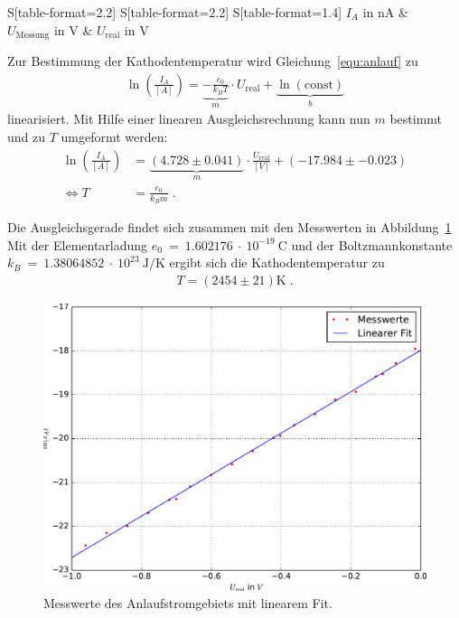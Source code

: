 \begin{table}
  \centering
  \caption{Stromstärke, Spannung und korrigierte Spannung im Anlaufstromgebiet.}
\label{tab:real}
  \begin{tabular}{
      S[table-format=2.2]
      S[table-format=2.2]
      S[table-format=1.4]
      }
      \toprule
       $\text{$I_A$ in $\si{\nano\ampere}$}$ & $\text{$U_{\mathrm{Messung}}$ in $\si{\volt}$}$ & $\text{$U_{\mathrm{real}}$ in $\si{\volt}$}$\\
      \midrule
      \bottomrule
  \end{tabular}
\end{table}

Zur Bestimmung der Kathodentemperatur wird Gleichung~\eqref{equ:anlauf} zu
\begin{align}
  \ln{(\frac{I_A}{[A]})} = \underbrace{- \frac{e_0}{k_B T}}_{m} \cdot U_{\mathrm{real}} + \underbrace{\ln{(\mathrm{const})}}_{b}
\end{align}
linearisiert. Mit Hilfe einer linearen Ausgleichsrechnung kann nun $m$ bestimmt und zu $T$ umgeformt werden:
\begin{align}
  \ln{(\frac{I_A}{[A]})} &= \underbrace{(4.728 \pm 0.041)}_{m} \cdot \frac{U_{\mathrm{real}}}{[V]} + (-17.984 \pm -0.023) \\
  \Leftrightarrow T &= \frac{e_0}{k_B m} \; .
\end{align}

Die Ausgleichsgerade findet sich zusammen mit den Messwerten in Abbildung~\ref{fig:T}
Mit der Elementarladung $e_0~=~1.602176~\cdot~10^{-19}~\si{\coulomb}$ und der Boltzmannkonstante $k_B~=~1.38064852~\cdot~10^{23}~\si{\joule\per\kelvin}$ ergibt sich die Kathodentemperatur zu
\begin{align}
  T = (2454 \pm 21) \si{\kelvin} \; .
\end{align}

\begin{figure}[H]
  \centering
  \includegraphics[width=0.6\textheight]{../plots/current.pdf}
  \caption{Messwerte des Anlaufstromgebiets mit linearem Fit. }
\label{fig:T}
\end{figure}

